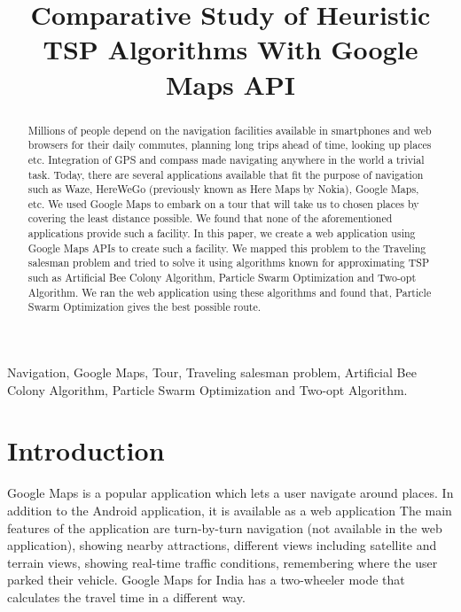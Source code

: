\documentclass[conference]{IEEEtran}
\begin{document}
\renewcommand\IEEEkeywordsname{Keywords:}

\title{Comparative Study of Heuristic TSP Algorithms With Google Maps API}

\author{
}
\maketitle

\begin{abstract}
Millions of people depend on the navigation facilities available in smartphones and web browsers for their daily commutes, planning long trips ahead of time, looking up places etc. Integration of GPS and compass made navigating anywhere in the world a trivial task. Today, there are several applications available that fit the purpose of navigation such as Waze, HereWeGo (previously known as Here Maps by Nokia), Google Maps, etc. We used Google Maps to embark on a tour that will take us to chosen places by covering the least distance possible. We found that none of the aforementioned applications provide such a facility. In this paper, we create a web application using Google Maps APIs to create such a facility. We mapped this problem to the Traveling salesman problem and tried to solve it using algorithms known for approximating TSP such as Artificial Bee Colony Algorithm, Particle Swarm Optimization and Two-opt Algorithm. We ran the web application using these algorithms and found that, Particle Swarm Optimization gives the best possible route.

\end{abstract}

\begin{IEEEkeywords}
Navigation, Google Maps, Tour, Traveling salesman problem, Artificial Bee Colony Algorithm, Particle Swarm Optimization and Two-opt Algorithm.
\end{IEEEkeywords}

\section{Introduction}
Google Maps is a popular application which lets a user navigate around places. In addition to the Android application, it is available as a web application  The main features of the application are turn-by-turn navigation (not available in the web application), showing nearby attractions, different views including satellite and terrain views, showing real-time traffic conditions, remembering where the user parked their vehicle. Google Maps for India has a two-wheeler mode that calculates the travel time in a different way. 
\end{document}

